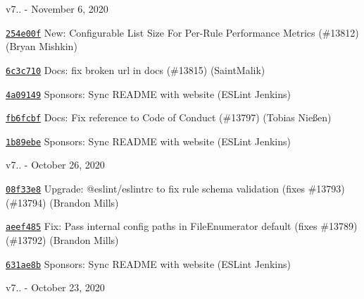 v7.. -\/ November 6, 2020


\begin{DoxyItemize}
\item \href{https://github.com/eslint/eslint/commit/254e00fea8745ff5a8bcc8cb874fcfd02996d81b}{\texttt{ {\ttfamily 254e00f}}} New\+: Configurable List Size For Per-\/\+Rule Performance Metrics (\#13812) (Bryan Mishkin)
\item \href{https://github.com/eslint/eslint/commit/6c3c710ade7cd8654990f1adb55b58f038eab92d}{\texttt{ {\ttfamily 6c3c710}}} Docs\+: fix broken url in docs (\#13815) (Saint\+Malik)
\item \href{https://github.com/eslint/eslint/commit/4a091495a236d231a5065ece972719a0c4dd1b77}{\texttt{ {\ttfamily 4a09149}}} Sponsors\+: Sync README with website (ESLint Jenkins)
\item \href{https://github.com/eslint/eslint/commit/fb6fcbfe0a8c41b92f0a33ab90f159037bd195e2}{\texttt{ {\ttfamily fb6fcbf}}} Docs\+: Fix reference to Code of Conduct (\#13797) (Tobias Nießen)
\item \href{https://github.com/eslint/eslint/commit/1b89ebe1bdbef7de6001100945b8f71429df302c}{\texttt{ {\ttfamily 1b89ebe}}} Sponsors\+: Sync README with website (ESLint Jenkins)
\end{DoxyItemize}

v7.. -\/ October 26, 2020


\begin{DoxyItemize}
\item \href{https://github.com/eslint/eslint/commit/08f33e8b9a353c3183be6f937785db7a30fb90eb}{\texttt{ {\ttfamily 08f33e8}}} Upgrade\+: @eslint/eslintrc to fix rule schema validation (fixes \#13793) (\#13794) (Brandon Mills)
\item \href{https://github.com/eslint/eslint/commit/aeef485dc790571b1a82ac09904329e0226b66a9}{\texttt{ {\ttfamily aeef485}}} Fix\+: Pass internal config paths in File\+Enumerator default (fixes \#13789) (\#13792) (Brandon Mills)
\item \href{https://github.com/eslint/eslint/commit/631ae8b50e5f7975f10860e9e763b70b4f25182e}{\texttt{ {\ttfamily 631ae8b}}} Sponsors\+: Sync README with website (ESLint Jenkins)
\end{DoxyItemize}

v7.. -\/ October 23, 2020


